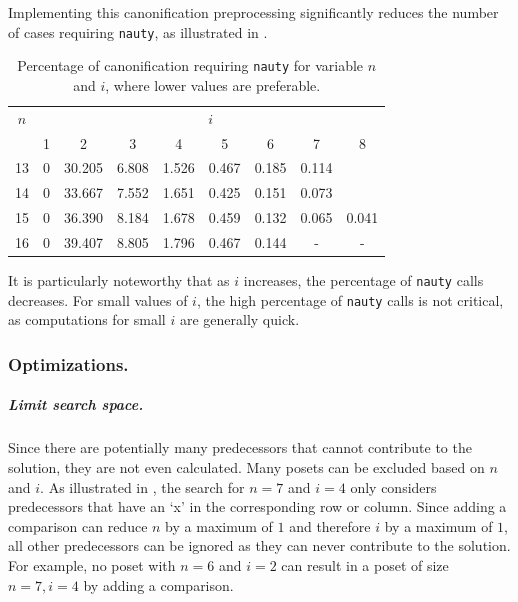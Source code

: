 \documentclass[a4paper,UKenglish,cleveref, autoref, thm-restate]{lipics-v2021}
\begin{document}
Implementing this canonification preprocessing significantly reduces the number of cases requiring \texttt{nauty}, as illustrated in .

\begin{table}[!t]
  \renewcommand{\arraystretch}{1.1}
  \caption{Percentage of canonification requiring \texttt{nauty} for variable $n$ and $i$, where lower values are preferable.}
  \label{table:nauty-ratio}
  \centering
  \small
    \begin{tabular}{c|cccccccc}
      $n$ & \multicolumn{8}{c}{$i$}                                                          \\
          & 1                       & 2      & 3     & 4     & 5     & 6     & 7     & 8     \\ \hline
      13  & 0                       & 30.205 & 6.808 & 1.526 & 0.467 & 0.185 & 0.114 &       \\
      14  & 0                       & 33.667 & 7.552 & 1.651 & 0.425 & 0.151 & 0.073 &       \\
      15  & 0                       & 36.390 & 8.184 & 1.678 & 0.459 & 0.132 & 0.065 & 0.041 \\
      16  & 0                       & 39.407 & 8.805 & 1.796 & 0.467 & 0.144 & -     & -     \\
    \end{tabular}%
\end{table}

It is particularly noteworthy that as $i$ increases, the percentage of \texttt{nauty} calls decreases.
For small values of $i$, the high percentage of \texttt{nauty} calls is not critical, as computations for small $i$ are generally quick.

\subsubsection{Optimizations.}

\subparagraph{Limit search space.}
Since there are potentially many predecessors that cannot contribute to the solution, they are not even calculated.
Many posets can be excluded based on $n$ and $i$.
As illustrated in , the search for $n = 7$ and $i = 4$ only considers predecessors that have an `x' in the corresponding row or column.
Since adding a comparison can reduce $n$ by a maximum of $1$ and therefore $i$ by a maximum of $1$, all other predecessors can be ignored as they can never contribute to the solution.
For example, no poset with $n = 6$ and $i = 2$ can result in a poset of size $n = 7, i = 4$ by adding a comparison.
\end{document}
